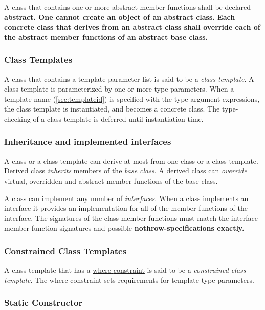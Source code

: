 \documentclass[a4paper,oneside,11pt]{article}
\begin{document}
A class that contains one or more abstract member functions shall be declared \bf{abstract}.
One cannot create an object of an abstract class.
Each concrete class that derives from an abstract class shall override each of the
abstract member functions of an abstract base class.

\subsubsection{Class Templates}

A class that contains a template parameter list is said to be a \emph{class template}.
A class template is parameterized by one or more type parameters.
When a template name (\ref{sec:templateid}) is specified with the type argument expressions,
the class template is instantiated, and becomes a concrete class.
The type-checking of a class template is deferred until instantiation time.

\subsubsection{Inheritance and implemented interfaces}

A class or a class template can derive at most from one class or a class template.
Derived class \emph{inherits} members of the \emph{base class}.
A derived class can \emph{override} virtual, overridden and abstract member functions of the base class.

A class can implement any number of \hyperref[sec:interface]{\emph{interfaces}}.
When a class implements an interface it provides an implementation for all of the member functions of the interface.
The signatures of the class member functions must match the interface member function signatures and possible \bf{nothrow}-specifications
exactly.

\subsubsection{Constrained Class Templates}

A class template that has a \hyperref[whereconstraint]{where\textrm{-}constraint} is said to be a \emph{constrained class template}.
The where-constraint sets requirements for template type parameters.

\subsubsection{Static Constructor}\label{staticconstructor}
\end{document}
